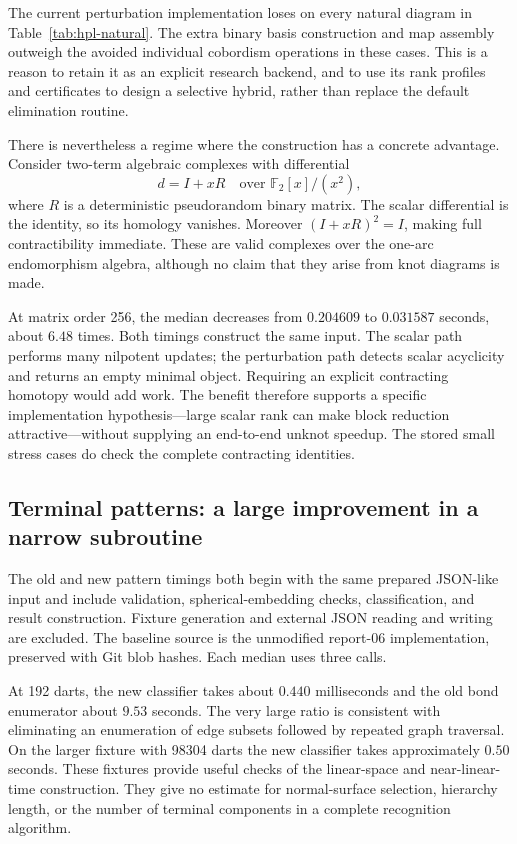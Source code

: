 The current perturbation implementation loses on every natural diagram
in Table~\ref{tab:hpl-natural}.  The extra binary basis construction and
map assembly outweigh the avoided individual cobordism operations in
these cases.  This is a reason to retain it as an explicit research
backend, and to use its rank profiles and certificates to design a
selective hybrid, rather than replace the default elimination routine.

There is nevertheless a regime where the construction has a concrete
advantage.  Consider two-term algebraic complexes with differential
\[
 d=I+xR\quad\text{over }\mathbb F_2[x]/(x^2),
\]
where $R$ is a deterministic pseudorandom binary matrix.  The scalar
differential is the identity, so its homology vanishes.  Moreover
$(I+xR)^2=I$, making full contractibility immediate.  These are valid
complexes over the one-arc endomorphism algebra, although no claim that
they arise from knot diagrams is made.



At matrix order 256, the median decreases from $0.204609$ to $0.031587$
seconds, about $6.48$ times.  Both timings construct the same input.
The scalar path performs many nilpotent updates; the perturbation path
detects scalar acyclicity and returns an empty minimal object.  Requiring
an explicit contracting homotopy would add work.  The benefit therefore
supports a specific implementation hypothesis---large scalar rank can
make block reduction attractive---without supplying an end-to-end
unknot speedup.  The stored small stress cases do check the complete
contracting identities.

\subsection{Terminal patterns: a large improvement in a narrow subroutine}




The old and new pattern timings both begin with the same prepared
JSON-like input and include validation, spherical-embedding checks,
classification, and result construction.  Fixture generation and
external JSON reading and writing are excluded.  The baseline source is
the unmodified report-06 implementation, preserved with Git blob hashes.
Each median uses three calls.

At 192 darts, the new classifier takes about $0.440$ milliseconds and the
old bond enumerator about $9.53$ seconds.  The very large ratio is
consistent with eliminating an enumeration of edge subsets followed by
repeated graph traversal.  On the larger fixture with 98304 darts the new
classifier takes approximately $0.50$ seconds.  These fixtures provide
useful checks of the linear-space and near-linear-time construction.
They give no estimate for normal-surface selection, hierarchy length, or
the number of terminal components in a complete recognition algorithm.


